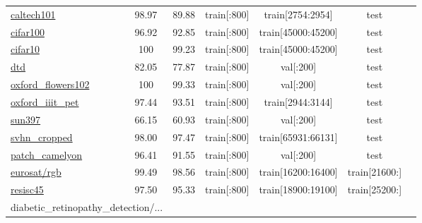 \documentclass{article} \usepackage{iclr2023_conference,times}
\begin{document}
\begin{table*}[h]
\begin{tabular}{lcccccc}
\href{https://www.tensorflow.org/datasets/catalog/caltech101}{caltech101}
&  98.97  &  89.88
& train[{\tiny:800}] & train[{\tiny2754:2954}] & test
& \citep{FeiFei2004LearningGV}
\\
\href{https://www.tensorflow.org/datasets/catalog/cifar100}{cifar100}
&  96.92  &  92.85
& train[{\tiny:800}] & train[{\tiny45000:45200}] & test
& \citep{Krizhevsky2009LearningML}
\\
\href{https://www.tensorflow.org/datasets/catalog/cifar10}{cifar10}
&  100  &  99.23
& train[{\tiny:800}] & train[{\tiny45000:45200}] & test
& \citep{Krizhevsky2009LearningML}
\\
\href{https://www.tensorflow.org/datasets/catalog/dtd}{dtd}
&  82.05  &  77.87
& train[{\tiny:800}] & val[{\tiny:200}] & test
& \citep{Cimpoi2014DescribingTI}
\\
\href{https://www.tensorflow.org/datasets/catalog/oxford_flowers102}{oxford\_flowers102}
&  100  &  99.33
& train[{\tiny:800}] & val[{\tiny:200}] & test
& \hspace{-10pt}\citep{Nilsback2008AutomatedFC}
\\
\href{https://www.tensorflow.org/datasets/catalog/oxford_iiit_pet}{oxford\_iiit\_pet}
&  97.44  &  93.51
& train[{\tiny:800}] & train[{\tiny2944:3144}] & test
& \citep{Parkhi2012CatsAD}
\\
\href{https://www.tensorflow.org/datasets/catalog/sun397}{sun397}
&  66.15  &  60.93
& train[{\tiny:800}] & val[{\tiny:200}] & test
& \citep{Xiao2010SUNDL}
\\
\href{https://www.tensorflow.org/datasets/catalog/svhn_cropped}{svhn\_cropped}
&  98.00  &  97.47
& train[{\tiny:800}] & train[{\tiny65931:66131}] & test
& \citep{Netzer2011ReadingDI}
\\
\href{https://www.tensorflow.org/datasets/catalog/patch_camelyon}{patch\_camelyon}
&  96.41  &  91.55
& train[{\tiny:800}] & val[{\tiny:200}] & test
& \citep{Veeling2018RotationEC}
\\
\href{https://www.tensorflow.org/datasets/catalog/eurosat#eurosatrgb_default_config}{eurosat/rgb}
 &  99.49  &  98.56
& train[{\tiny:800}] & train[{\tiny16200:16400}] & train[{\tiny21600:}]
& \citep{Helber2019EuroSATAN}
\\
\href{https://www.tensorflow.org/datasets/catalog/resisc45}{resisc45}
&  97.50  &  95.33
& train[{\tiny:800}] & train[{\tiny18900:19100}] & train[{\tiny25200:}]
& \citep{Cheng2017RemoteSI}
\\
\multicolumn{2}{l}{
diabetic\_retinopathy\_detection/...
}
\\

\end{tabular}
\end{table*}
\end{document}
